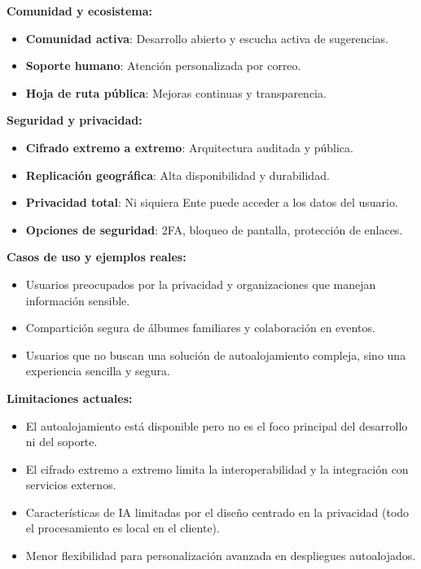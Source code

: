 \textbf{Comunidad y ecosistema:}
\begin{itemize}
    \item \textbf{Comunidad activa}: Desarrollo abierto y escucha activa de sugerencias.
    \item \textbf{Soporte humano}: Atención personalizada por correo.
    \item \textbf{Hoja de ruta pública}: Mejoras continuas y transparencia.
\end{itemize}

\textbf{Seguridad y privacidad:}
\begin{itemize}
    \item \textbf{Cifrado extremo a extremo}: Arquitectura auditada y pública.
    \item \textbf{Replicación geográfica}: Alta disponibilidad y durabilidad.
    \item \textbf{Privacidad total}: Ni siquiera Ente puede acceder a los datos del usuario.
    \item \textbf{Opciones de seguridad}: 2FA, bloqueo de pantalla, protección de enlaces.
\end{itemize}

\textbf{Casos de uso y ejemplos reales:}
\begin{itemize}
    \item Usuarios preocupados por la privacidad y organizaciones que manejan información sensible.
    \item Compartición segura de álbumes familiares y colaboración en eventos.
    \item Usuarios que no buscan una solución de autoalojamiento compleja, sino una experiencia sencilla y segura.
\end{itemize}

\textbf{Limitaciones actuales:}
\begin{itemize}
    \item El autoalojamiento está disponible pero no es el foco principal del desarrollo ni del soporte.
    \item El cifrado extremo a extremo limita la interoperabilidad y la integración con servicios externos.
    \item Características de IA limitadas por el diseño centrado en la privacidad (todo el procesamiento es local en el cliente).
    \item Menor flexibilidad para personalización avanzada en despliegues autoalojados.
\end{itemize}

